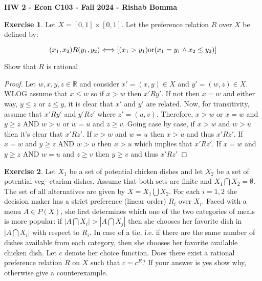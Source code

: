 \documentclass[11pt,oneside]{article}
\numberwithin{equation}{section}
\theoremstyle{definition}
\newtheorem{exercise}{Exercise}
\def\RR{\mathbb{R}}
\newcommand{\IFF}{\Longleftrightarrow}
\newcommand{\intersect}{\bigcap}
\newcommand{\union}{\bigcup}
\newcommand{\tn}[1]{\textnormal{#1}}
\begin{document}
\textbf{HW 2 - Econ C103 - Fall 2024 - Rishab Bomma}

\begin{exercise}

Let $X = [0, 1] \times [0, 1]$. Let the preference relation $R$ over $X$ be defined by:

\[(x_1, x_2)R(y_1, y_2) \IFF [(x_1 > y_1) \tn{or} (x_1 = y_1 \land x_2 \leq y_2)] \]

Show that $R$ is rational 




\end{exercise}

\begin{proof}

Let $w, x, y, z \in \RR$ and consider $x' = (x,y) \in X$ and $y' = (w,z) \in X$. WLOG assume that $x \leq w$ so if $x>w$ then $x' R y'$. If not then $x = w$ and either way, $y \leq z$ or $z \leq y$, it is clear that $x'$ and $y'$ are related. Now, for transitivity, assume that $x' R y'$ and $y' R z'$ where $z' = (u,v)$. Therefore, $x > w$ or $x =w$ and $y \geq z$ AND $w > u$ or $w = u$ and $z \geq v$. Going case by case, if $x>w$ and $w>u$ then it's clear that $x' R z'$. If $x>w$ and $w = u$ then $x>u$ and thus $x' R z'$. If $x =w$ and $y \geq z$ AND $w>u$ then $x>u$ which implies that $x' R z'$. If $x = w$ and $y\geq z$ AND $w = u$ and $z \geq v$ then $y\geq v$ and thus $x' R z'$ 

\end{proof}

\begin{exercise}

Let $X_1$ be a set of potential chicken dishes and let $X_2$ be a set of potential veg-
etarian dishes. Assume that both sets are finite and $X_1 \intersect X_2 = \emptyset$. The set of
all alternatives are given by $X = X_1 \union X_2$. For each $i = 1, 2$ the decision maker
has a strict preference (linear order) $R_i$ over $X_i$. Faced with a menu $A \in P(X)$,
she first determines which one of the two categories of meals is more popular: if
$|A \intersect X_i| > |A \intersect X_j |$ then she chooses her favorite dish in $|A \intersect X_i|$ with respect to
$R_i$. In case of a tie, i.e. if there are the same number of dishes available from each
category, then she chooses her favorite available chicken dish. Let $c$ denote her
choice function. Does there exist a rational preference relation $R$ on $X$ such that
$c = c^R$? If your answer is yes show why, otherwise give a counterexample.


\end{exercise}
\end{document}
